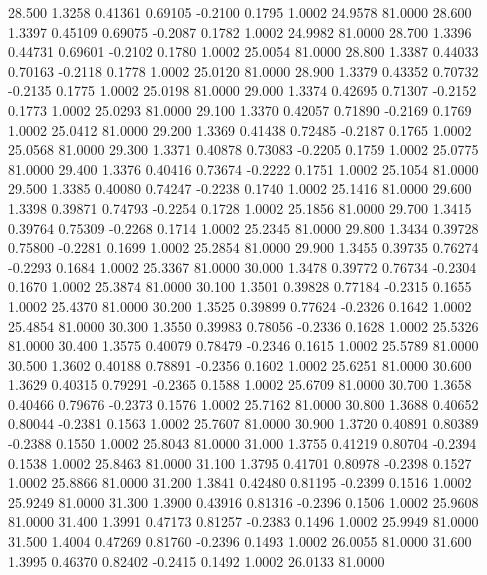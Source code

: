   28.500   1.3258   0.41361   0.69105  -0.2100   0.1795   1.0002  24.9578  81.0000
  28.600   1.3397   0.45109   0.69075  -0.2087   0.1782   1.0002  24.9982  81.0000
  28.700   1.3396   0.44731   0.69601  -0.2102   0.1780   1.0002  25.0054  81.0000
  28.800   1.3387   0.44033   0.70163  -0.2118   0.1778   1.0002  25.0120  81.0000
  28.900   1.3379   0.43352   0.70732  -0.2135   0.1775   1.0002  25.0198  81.0000
  29.000   1.3374   0.42695   0.71307  -0.2152   0.1773   1.0002  25.0293  81.0000
  29.100   1.3370   0.42057   0.71890  -0.2169   0.1769   1.0002  25.0412  81.0000
  29.200   1.3369   0.41438   0.72485  -0.2187   0.1765   1.0002  25.0568  81.0000
  29.300   1.3371   0.40878   0.73083  -0.2205   0.1759   1.0002  25.0775  81.0000
  29.400   1.3376   0.40416   0.73674  -0.2222   0.1751   1.0002  25.1054  81.0000
  29.500   1.3385   0.40080   0.74247  -0.2238   0.1740   1.0002  25.1416  81.0000
  29.600   1.3398   0.39871   0.74793  -0.2254   0.1728   1.0002  25.1856  81.0000
  29.700   1.3415   0.39764   0.75309  -0.2268   0.1714   1.0002  25.2345  81.0000
  29.800   1.3434   0.39728   0.75800  -0.2281   0.1699   1.0002  25.2854  81.0000
  29.900   1.3455   0.39735   0.76274  -0.2293   0.1684   1.0002  25.3367  81.0000
  30.000   1.3478   0.39772   0.76734  -0.2304   0.1670   1.0002  25.3874  81.0000
  30.100   1.3501   0.39828   0.77184  -0.2315   0.1655   1.0002  25.4370  81.0000
  30.200   1.3525   0.39899   0.77624  -0.2326   0.1642   1.0002  25.4854  81.0000
  30.300   1.3550   0.39983   0.78056  -0.2336   0.1628   1.0002  25.5326  81.0000
  30.400   1.3575   0.40079   0.78479  -0.2346   0.1615   1.0002  25.5789  81.0000
  30.500   1.3602   0.40188   0.78891  -0.2356   0.1602   1.0002  25.6251  81.0000
  30.600   1.3629   0.40315   0.79291  -0.2365   0.1588   1.0002  25.6709  81.0000
  30.700   1.3658   0.40466   0.79676  -0.2373   0.1576   1.0002  25.7162  81.0000
  30.800   1.3688   0.40652   0.80044  -0.2381   0.1563   1.0002  25.7607  81.0000
  30.900   1.3720   0.40891   0.80389  -0.2388   0.1550   1.0002  25.8043  81.0000
  31.000   1.3755   0.41219   0.80704  -0.2394   0.1538   1.0002  25.8463  81.0000
  31.100   1.3795   0.41701   0.80978  -0.2398   0.1527   1.0002  25.8866  81.0000
  31.200   1.3841   0.42480   0.81195  -0.2399   0.1516   1.0002  25.9249  81.0000
  31.300   1.3900   0.43916   0.81316  -0.2396   0.1506   1.0002  25.9608  81.0000
  31.400   1.3991   0.47173   0.81257  -0.2383   0.1496   1.0002  25.9949  81.0000
  31.500   1.4004   0.47269   0.81760  -0.2396   0.1493   1.0002  26.0055  81.0000
  31.600   1.3995   0.46370   0.82402  -0.2415   0.1492   1.0002  26.0133  81.0000
